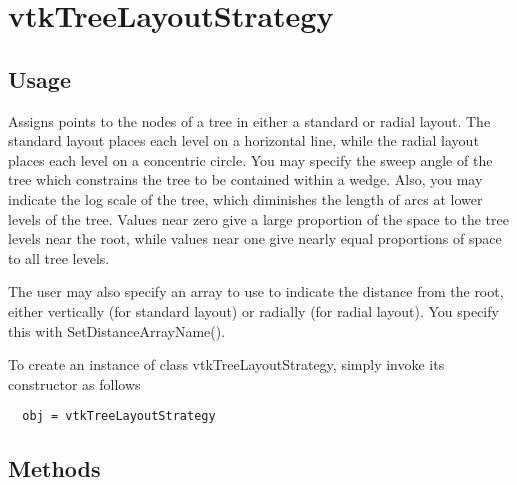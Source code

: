 \section{vtkTreeLayoutStrategy}

\subsection{Usage}

 Assigns points to the nodes of a tree in either a standard or radial layout.
 The standard layout places each level on a horizontal line, while the
 radial layout places each level on a concentric circle.
 You may specify the sweep angle of the tree which constrains the tree
 to be contained within a wedge. Also, you may indicate the log scale of
 the tree, which diminishes the length of arcs at lower levels of the tree.
 Values near zero give a large proportion of the space to the tree levels
 near the root, while values near one give nearly equal proportions of space
 to all tree levels.

 The user may also specify an array to use to indicate the distance from the
 root, either vertically (for standard layout) or radially
 (for radial layout).  You specify this with SetDistanceArrayName().

To create an instance of class vtkTreeLayoutStrategy, simply
invoke its constructor as follows
\begin{verbatim}
  obj = vtkTreeLayoutStrategy
\end{verbatim}
\subsection{Methods}

